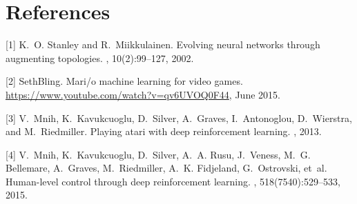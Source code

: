 \documentclass[t,pdflatex]{beamer}
\begin{document}
    \section{References}

    \begin{frame}
        \begin{thebibliography}{10}
        \beamertemplatearticlebibitems{}



        [1] K.~O. Stanley and R.~Miikkulainen.
        \newblock Evolving neural networks through augmenting topologies.
        , 10(2):99--127, 2002.

        [2] SethBling.
        \newblock Mari/o machine learning for video games.
        \newblock \url{https://www.youtube.com/watch?v=qv6UVOQ0F44}, June 2015.

        [3] V.~Mnih, K.~Kavukcuoglu, D.~Silver, A.~Graves, I.~Antonoglou, D.~Wierstra, and
          M.~Riedmiller.
        \newblock Playing atari with deep reinforcement learning.
        , 2013.

        [4] V.~Mnih, K.~Kavukcuoglu, D.~Silver, A.~A. Rusu, J.~Veness, M.~G. Bellemare,
          A.~Graves, M.~Riedmiller, A.~K. Fidjeland, G.~Ostrovski, et~al.
        \newblock Human-level control through deep reinforcement learning.
        , 518(7540):529--533, 2015.



        \end{thebibliography}
        \end{frame}
\end{document}
